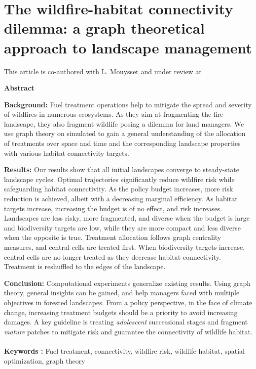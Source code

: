 \chapter{The wildfire-habitat connectivity dilemma: a graph theoretical approach to landscape management}
\label{chapter2}
\begin{center}
	\begin{minipage}{.9\textwidth}
This article is co-authored with L. Mouysset and under review at 
	\end{minipage}
    \vspace*{.2cm}
    
\textbf{Abstract}\par
    \vspace*{.2cm}
    \noindent
    \begin{minipage}{0.9\textwidth}
	\singlespacing
\textbf{Background:} Fuel treatment operations help to mitigate the spread and severity of wildfires in numerous ecosystems. As they aim at fragmenting the fire landscape, they also fragment wildlife posing a dilemma for land managers. We use graph theory on simulated to gain a general understanding of the allocation of treatments over space and time and the corresponding landscape properties with various habitat connectivity targets. 
 
\textbf{Results:} Our results show that all initial landscapes converge to steady-state landscape cycles. Optimal trajectories significantly reduce wildfire risk while safeguarding habitat connectivity. As the policy budget increases, more risk reduction is achieved, albeit with a decreasing marginal efficiency. As habitat targets increase, increasing the budget is of no effect, and risk increases. Landscapes are less risky, more fragmented, and diverse when the budget is large and biodiversity targets are low, while they are more compact and less diverse when the opposite is true. Treatment allocation follows graph centrality measures, and central cells are treated first. When biodiversity targets increase, central cells are no longer treated as they decrease habitat connectivity. Treatment is reshuffled to the edges of the landscape.


\textbf{Conclusion:} Computational experiments generalize existing results. Using graph theory, general insights can be gained, and help managers faced with multiple objectives in forested landscapes. From a policy perspective, in the face of climate change, increasing treatment budgets should be a priority to avoid increasing damages. A key guideline is treating \textit{adolescent} successional stages and fragment \textit{mature} patches to mitigate risk and guarantee the connectivity of wildlife habitat. 
\\\\
\textbf{Keywords : }Fuel treatment, connectivity, wildfire risk, wildlife habitat, spatial optimization, graph theory
\end{minipage}
\end{center}

